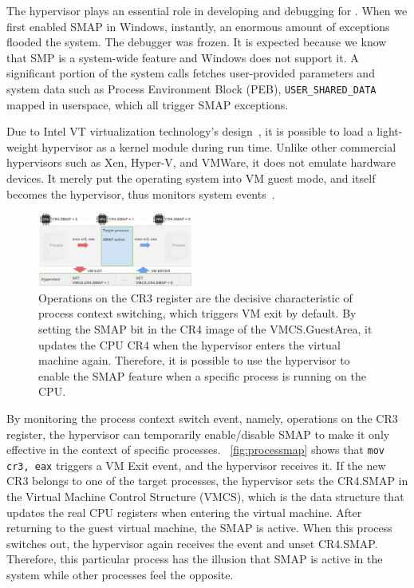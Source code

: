 The hypervisor plays an essential role in developing and debugging for \name. When we first enabled SMAP in Windows, instantly, an enormous amount of exceptions flooded the system. The debugger was frozen.  It is expected because we know that SMP is a system-wide feature and Windows does not support it. A significant portion of the system calls fetches user-provided parameters and system data such as Process Environment Block (PEB), \texttt{USER\_SHARED\_DATA} mapped in userspace, which all trigger SMAP exceptions.

Due to Intel VT virtualization technology's design~\cite{neiger2006intel}, it is possible to load a light-weight hypervisor as a kernel module during run time. Unlike other commercial hypervisors such as Xen, Hyper-V, and VMWare, it does not emulate hardware devices. It merely put the operating system into VM guest mode, and itself becomes the hypervisor, thus monitors system events~\cite{howtohide}.

\begin{figure}[th]
  \includegraphics[width=0.47\textwidth]{figures/processmap4}
  \centering
  \caption{Operations on the CR3 register are the decisive characteristic of process context switching, which triggers VM exit by default. By setting the SMAP bit in the CR4 image of the VMCS.GuestArea, it updates the CPU CR4 when the hypervisor enters the virtual machine again. Therefore, it is possible to use the hypervisor to enable the SMAP feature when a specific process is running on the CPU.}
  \label{fig:processmap}
\end{figure}


By monitoring the process context switch event, namely, operations on the CR3 register, the hypervisor can temporarily enable/disable SMAP to make it only effective in the context of specific processes. ~\autoref{fig:processmap} shows that \texttt{mov cr3, eax} triggers a VM Exit event, and the hypervisor receives it. If the new CR3 belongs to one of the target processes, the hypervisor sets the CR4.SMAP in the Virtual Machine Control Structure (VMCS), which is the data structure that updates the real CPU registers when entering the virtual machine. After returning to the guest virtual machine, the SMAP is active. When this process switches out, the hypervisor again receives the event and unset CR4.SMAP. Therefore, this particular process has the illusion that SMAP is active in the system while other processes feel the opposite.


